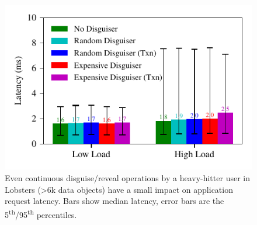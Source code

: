 \begin{figure}[t]
    \centering
        \includegraphics{figs/lobsters_concurrent_results}
        \caption{Even continuous disguise/reveal operations by a heavy-hitter user in Lobsters (>6k
          data objects) have a small impact on application request latency. Bars show median latency,
          error bars are the 5\textsuperscript{th}/95\textsuperscript{th} percentiles.}
        \label{f:concurrent-lobsters}
\end{figure}

